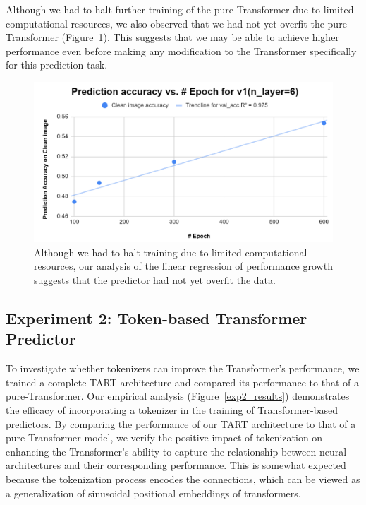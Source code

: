 \documentclass{article}
\begin{document}
Although we had to halt further training of the pure-Transformer due to limited computational resources, we also observed that we had not yet overfit the pure-Transformer (Figure~\ref{exp1-2_results}). This suggests that we may be able to achieve higher performance even before making any modification to the Transformer specifically for this prediction task.

\begin{figure}
    \centering
    \includegraphics[width=\textwidth]{images/exp1-2_results.png}
    \caption{Although we had to halt training due to limited computational resources, our analysis of the linear regression of performance growth suggests that the predictor had not yet overfit the data.}
    \label{exp1-2_results}
\end{figure}

\subsection{Experiment 2: Token-based Transformer Predictor}
\label{experiment:Tokenizer_Transformer}
To investigate whether tokenizers can improve the Transformer's performance, we trained a complete TART architecture and compared its performance to that of a pure-Transformer. Our empirical analysis (Figure~\ref{exp2_results}) demonstrates the efficacy of incorporating a tokenizer in the training of Transformer-based predictors. By comparing the performance of our TART architecture to that of a pure-Transformer model, we verify the positive impact of tokenization on enhancing the Transformer's ability to capture the relationship between neural architectures and their corresponding performance. This is somewhat expected because the tokenization process encodes the connections, which can be viewed as a generalization of sinusoidal positional embeddings of transformers. 
\end{document}
